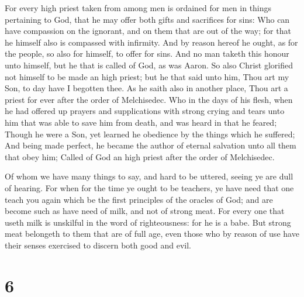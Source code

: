  For every high priest taken from among men is ordained
for men in things pertaining to God, that he may offer both gifts and
sacrifices for sins:  Who can have compassion on the
ignorant, and on them that are out of the way; for that he himself also
is compassed with infirmity.  And by reason hereof he
ought, as for the people, so also for himself, to offer for sins.
 And no man taketh this honour unto himself, but he that
is called of God, as was Aaron.  So also Christ glorified
not himself to be made an high priest; but he that said unto him, Thou
art my Son, to day have I begotten thee.  As he saith also
in another place, Thou art a priest for ever after the order of
Melchisedec.  Who in the days of his flesh, when he had
offered up prayers and supplications with strong crying and tears unto
him that was able to save him from death, and was heard in that he
feared;  Though he were a Son, yet learned he obedience by
the things which he suffered;  And being made perfect, he
became the author of eternal salvation unto all them that obey him;
 Called of God an high priest after the order of
Melchisedec.

 Of whom we have many things to say, and hard to be
uttered, seeing ye are dull of hearing.  For when for the
time ye ought to be teachers, ye have need that one teach you again
which be the first principles of the oracles of God; and are become such
as have need of milk, and not of strong meat.  For every
one that useth milk is unskilful in the word of righteousness: for he is
a babe.  But strong meat belongeth to them that are of
full age, even those who by reason of use have their senses exercised to
discern both good and evil.

\hypertarget{section-5}{%
\section{6}\label{section-5}}

